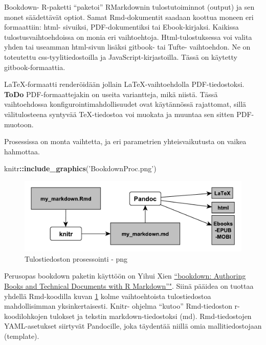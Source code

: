 \documentclass[
  finnish,
]{book}
\newenvironment{Shaded}{\begin{snugshade}}{\end{snugshade}}
\newcommand{\KeywordTok}[1]{\textcolor[rgb]{0.13,0.29,0.53}{\textbf{#1}}}
\newcommand{\NormalTok}[1]{#1}
\newcommand{\OperatorTok}[1]{\textcolor[rgb]{0.81,0.36,0.00}{\textbf{#1}}}
\newcommand{\StringTok}[1]{\textcolor[rgb]{0.31,0.60,0.02}{#1}}
\begin{document}
Bookdown- R-paketti ``paketoi'' RMarkdownin tulostutoiminnot (output) ja sen monet säädettävät optiot. Samat Rmd-dokumentit saadaan koottua moneen eri formaattiin: html- sivuiksi, PDF-dokumentiksi tai Ebook-kirjaksi. Kaikissa tulostusvaihtoehdoissa on monia eri vaihtoehtoja. Html-tulostuksessa voi valita yhden tai useamman html-sivun lisäksi gitbook- tai Tufte- vaihtoehdon. Ne on toteutettu css-tyylitiedostoilla ja JavaScript-kirjastoilla. Tässä on käytetty gitbook-formaattia.

LaTeX-formaatti renderöidään jollain LaTeX-vaihtoehdolla PDF-tiedostoksi. \textbf{ToDo} PDF-formaattejakin on useita variantteja, mikä niistä. Tässä vaihtoehdossa konfigurointimahdollisuudet ovat käytännössä rajattomat, sillä välitulosteena syntyvää TeX-tiedostoa voi muokata ja muuntaa sen sitten PDF-muotoon.

Prosessissa on monta vaihtetta, ja eri parametrien yhteisvaikutusta on vaikea hahmottaa.

\begin{Shaded}
\begin{Highlighting}[]
\NormalTok{knitr}\OperatorTok{::}\KeywordTok{include_graphics}\NormalTok{(}\StringTok{'BookdownProc.png'}\NormalTok{)}
\end{Highlighting}
\end{Shaded}

\begin{figure}

{\centering \includegraphics[width=0.5\linewidth]{BookdownProc} 

}

\caption{Tulostiedoston prosessointi - png}\label{fig:bdprocess1}
\end{figure}

Perusopas bookdown paketin käyttöön on Yihui Xien \href{https://bookdown.org/yihui/bookdown/}{``bookdown: Authoring Books and Technical Documents with R Markdown''"}. Siinä pääidea on tuottaa yhdellä Rmd-koodilla kuvan
\ref{fig:bdprocess1} kolme vaihtoehtoista tulostiedostoa mahdollisimman yksinkertaisesti. Knitr- ohjelma ``kutoo'' Rmd-tiedoston r-koodilohkojen tulokset ja tekstin markdown-tiedostoksi (md). Rmd-tiedostojen YAML-asetukset siirtyvät Pandocille, joka täydentää niillä omia mallitiedostojaan (template).
\end{document}
